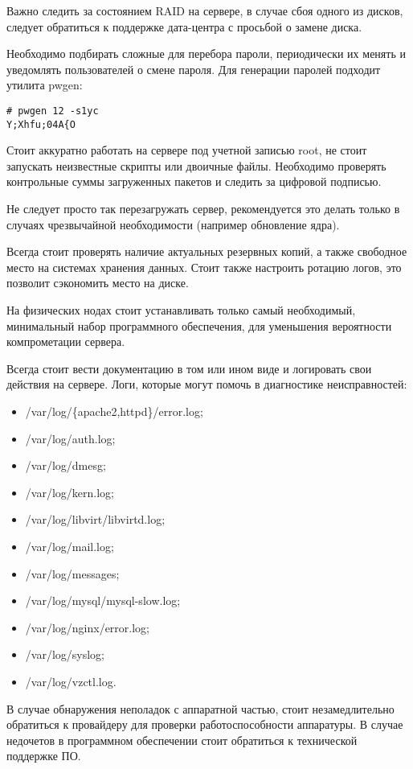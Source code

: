 Важно следить за состоянием RAID на сервере, в случае сбоя одного из дисков, следует обратиться к поддержке дата-центра с просьбой о замене диска.

Необходимо подбирать сложные для перебора пароли, периодически их менять и уведомлять пользователей о смене пароля.
Для генерации паролей подходит утилита pwgen:
\begin{lstlisting}
# pwgen 12 -s1yc
Y;Xhfu;04A{O
\end{lstlisting}

Стоит аккуратно работать на сервере под учетной записью root, не стоит запускать неизвестные скрипты или двоичные файлы.
Необходимо проверять контрольные суммы загруженных пакетов и следить за цифровой подписью.

Не следует просто так перезагружать сервер, рекомендуется это делать только в случаях чрезвычайной необходимости (например обновление ядра).

Всегда стоит проверять наличие актуальных резервных копий, а также свободное место на системах хранения данных.
Стоит также настроить ротацию логов, это позволит сэкономить место на диске.

На физических нодах стоит устанавливать только самый необходимый, минимальный набор программного обеспечения, для уменьшения вероятности компрометации сервера.

Всегда стоит вести документацию в том или ином виде и логировать свои действия на сервере.
Логи, которые могут помочь в диагностике неисправностей:
\begin{itemize}
  \item /var/log/\{apache2,httpd\}/error.log;
  \item /var/log/auth.log;
  \item /var/log/dmesg;
  \item /var/log/kern.log;
  \item /var/log/libvirt/libvirtd.log;
  \item /var/log/mail.log;
  \item /var/log/messages;
  \item /var/log/mysql/mysql-slow.log;
  \item /var/log/nginx/error.log;
  \item /var/log/syslog;
  \item /var/log/vzctl.log.
\end{itemize}

В случае обнаружения неполадок с аппаратной частью, стоит незамедлительно обратиться к провайдеру для проверки работоспособности аппаратуры.
В случае недочетов в программном обеспечении стоит обратиться к технической поддержке ПО.

\clearpage
